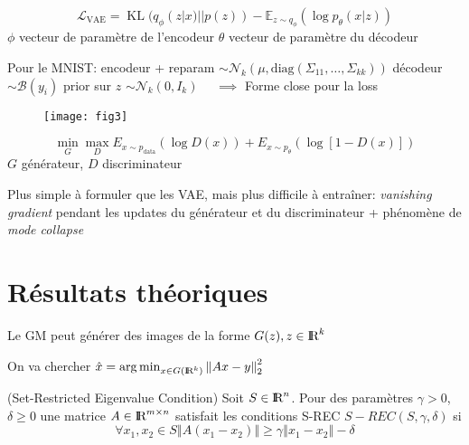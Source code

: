 \documentclass{beamer}
\def\R{\textrm{I\kern-0.21emR}}
\DeclareMathOperator*{\data}{\text{data}}
\DeclareMathOperator*{\kl}{\text{KL}}
\DeclareMathOperator*{\argmin}{arg\,min}
\newcommand{\norm}[1]{\left\Vert #1\right\Vert}
\begin{document}
\begin{frame}{\secname}
$$\mathcal L_{\text{VAE}} = \kl(q_\phi(z|x)||p(z)) - \mathbb{E}_{z \sim q_\phi}(\log p_\theta(x|z)) $$
$\phi$ vecteur de paramètre de l'encodeur\newline
$\theta$ vecteur de paramètre du décodeur
    \vspace{1em}
    
Pour le MNIST: \newline
encodeur + reparam $\sim \mathcal N_k(\mu, \text{diag}(\Sigma_{11},\ldots, \Sigma_{kk}))$\newline
décodeur $\sim \mathcal B(y_i)$\newline
prior sur $z$ $\sim \mathcal N_k(0, I_k)$ $\quad \implies$ Forme close pour la loss 
\begin{figure}
\texttt{[image: fig3]}
\end{figure}
\end{frame}


\begin{frame}{\secname}
$$\min_G \max_D E_{x\sim p_{\data}}(\log D(x)) +  E_{x\sim p_{\theta}}(\log[1-D(x)])$$
$G$ générateur, $D$ discriminateur
    \vspace{1em}
    
Plus simple à formuler que les VAE, mais plus difficile à entraîner: \textit{vanishing gradient} pendant les updates du générateur et du discriminateur + phénomène de \textit{mode collapse}

\end{frame}


\section{Résultats théoriques}

\begin{frame}{\secname}
Le GM peut générer des images de la forme $G(z), z \in \R^k $ 

On va chercher $\hat{x} = \argmin_{x \in G(\R^k)} \norm{Ax - y}_2^2$


\end{frame}

\begin{frame}{\secname}
    \begin{definition} (Set-Restricted Eigenvalue Condition)
Soit $S \in \R^n$. Pour des paramètres $\gamma > 0$, $\delta \geq 0$ une matrice $A \in \R^{m \times n}$ satisfait les conditions S-REC $S-REC(S,\gamma,\delta)$ si 
$$\forall x_1, x_2 \in S \norm{A(x_1 - x_2)} \geq \gamma \norm{x_1 - x_2} - \delta$$
\end{definition}
\end{frame}
\end{document}
